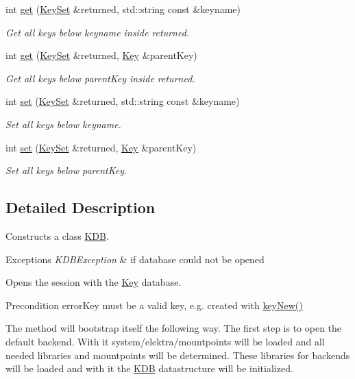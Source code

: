 \begin{DoxyCompactItemize}
int \hyperlink{classkdb_1_1KDB_a0419ffbc273c89756bc523b4223ec25a}{get} (\hyperlink{classkdb_1_1KeySet}{Key\-Set} \&returned, std\-::string const \&keyname)
\begin{DoxyCompactList}\small\item\em Get all keys below keyname inside returned. \end{DoxyCompactList}\item 
int \hyperlink{classkdb_1_1KDB_a48770a7290699bf2b7529f3ab67e378f}{get} (\hyperlink{classkdb_1_1KeySet}{Key\-Set} \&returned, \hyperlink{classkdb_1_1Key}{Key} \&parent\-Key)
\begin{DoxyCompactList}\small\item\em Get all keys below parent\-Key inside returned. \end{DoxyCompactList}\item 
int \hyperlink{classkdb_1_1KDB_a29087a6a1a7de334f4e5b62ffe5d6e6e}{set} (\hyperlink{classkdb_1_1KeySet}{Key\-Set} \&returned, std\-::string const \&keyname)
\begin{DoxyCompactList}\small\item\em Set all keys below keyname. \end{DoxyCompactList}\item 
int \hyperlink{classkdb_1_1KDB_a62a4fafbe21d9519b31a7868aa05f3e3}{set} (\hyperlink{classkdb_1_1KeySet}{Key\-Set} \&returned, \hyperlink{classkdb_1_1Key}{Key} \&parent\-Key)
\begin{DoxyCompactList}\small\item\em Set all keys below parent\-Key. \end{DoxyCompactList}\end{DoxyCompactItemize}


\subsection{Detailed Description}
Constructs a class \hyperlink{classkdb_1_1KDB}{K\-D\-B}.  


\begin{DoxyExceptions}{Exceptions}
{\em K\-D\-B\-Exception} & if database could not be opened\\
\hline
\end{DoxyExceptions}
Opens the session with the \hyperlink{classkdb_1_1Key}{Key} database.  \begin{DoxyPrecond}{Precondition}
error\-Key must be a valid key, e.\-g. created with \hyperlink{group__key_gad23c65b44bf48d773759e1f9a4d43b89}{key\-New()}
\end{DoxyPrecond}
The method will bootstrap itself the following way. The first step is to open the default backend. With it system/elektra/mountpoints will be loaded and all needed libraries and mountpoints will be determined. These libraries for backends will be loaded and with it the {\ttfamily \hyperlink{classkdb_1_1KDB}{K\-D\-B}} datastructure will be initialized.

